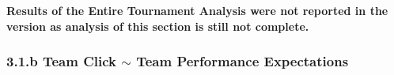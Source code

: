\textbf{Results of the Entire Tournament Analysis were not reported in the version as analysis of this section is still not complete.}

\subsubsection{3.1.b Team Click $\sim$ Team Performance Expectations}



%



